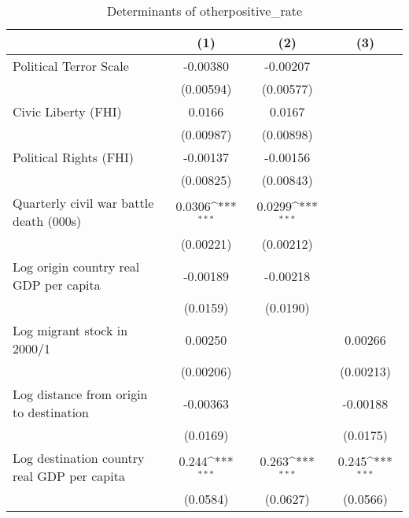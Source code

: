 \begin{table}[htbp]\centering
\def\sym#1{\ifmmode^{#1}\else\(^{#1}\)\fi}
\caption{Determinants of otherpositive\_rate}
\begin{tabular}{l*{3}{c}}
\hline\hline
                    &\multicolumn{1}{c}{(1)}         &\multicolumn{1}{c}{(2)}         &\multicolumn{1}{c}{(3)}         \\
\hline
Political Terror Scale&    -0.00380         &    -0.00207         &                     \\
                    &   (0.00594)         &   (0.00577)         &                     \\
[1em]
Civic Liberty (FHI) &      0.0166         &      0.0167         &                     \\
                    &   (0.00987)         &   (0.00898)         &                     \\
[1em]
Political Rights (FHI)&    -0.00137         &    -0.00156         &                     \\
                    &   (0.00825)         &   (0.00843)         &                     \\
[1em]
Quarterly civil war battle death (000s)&      0.0306\sym{***}&      0.0299\sym{***}&                     \\
                    &   (0.00221)         &   (0.00212)         &                     \\
[1em]
Log origin country real GDP per capita&    -0.00189         &    -0.00218         &                     \\
                    &    (0.0159)         &    (0.0190)         &                     \\
[1em]
Log migrant stock in 2000/1&     0.00250         &                     &     0.00266         \\
                    &   (0.00206)         &                     &   (0.00213)         \\
[1em]
Log distance from origin to destination&    -0.00363         &                     &    -0.00188         \\
                    &    (0.0169)         &                     &    (0.0175)         \\
[1em]
Log destination country real GDP per capita&       0.244\sym{***}&       0.263\sym{***}&       0.245\sym{***}\\
                    &    (0.0584)         &    (0.0627)         &    (0.0566)         \\

\end{tabular}
\end{table}
